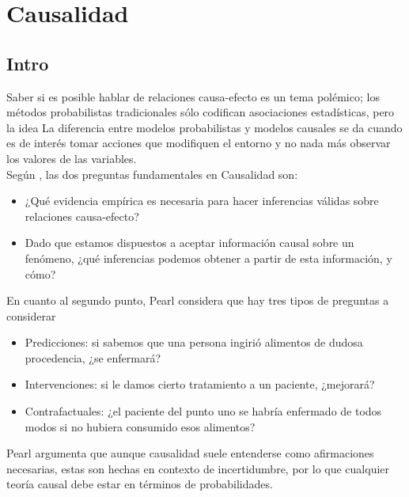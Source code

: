 \documentclass[11pt]{article}
\theoremstyle{plain}
\begin{document}
\section{Causalidad}
\subsection{Intro}
Saber si es posible hablar de relaciones causa-efecto es un tema polémico; los métodos probabilistas tradicionales sólo codifican asociaciones estadísticas, pero la idea
La diferencia entre modelos probabilistas y modelos causales se da cuando es de interés tomar acciones que modifiquen el entorno y no nada más observar los valores de las variables. \\
Según \cite{pearl2014probabilistic}, las dos preguntas fundamentales en Causalidad son:
\begin{itemize}
\item ¿Qué evidencia empírica es necesaria para hacer inferencias válidas sobre relaciones causa-efecto?
\item Dado que estamos dispuestos a aceptar información causal sobre un fenómeno, ¿qué inferencias podemos obtener a partir de esta información, y cómo?
\end{itemize}
En cuanto al segundo punto, Pearl considera que hay tres tipos de preguntas a considerar
\begin{itemize}
\item Predicciones: si sabemos que una persona ingirió alimentos de dudosa procedencia, ¿se enfermará?
\item Intervenciones: si le damos cierto tratamiento a un paciente, ¿mejorará?
\item Contrafactuales: ¿el paciente del punto uno se habría enfermado de todos modos si no hubiera consumido esos alimentos?
\end{itemize}
Pearl argumenta que aunque causalidad suele entenderse como afirmaciones necesarias, estas son hechas en contexto de incertidumbre, por lo que cualquier teoría causal debe estar en términos de probabilidades.
\end{document}
